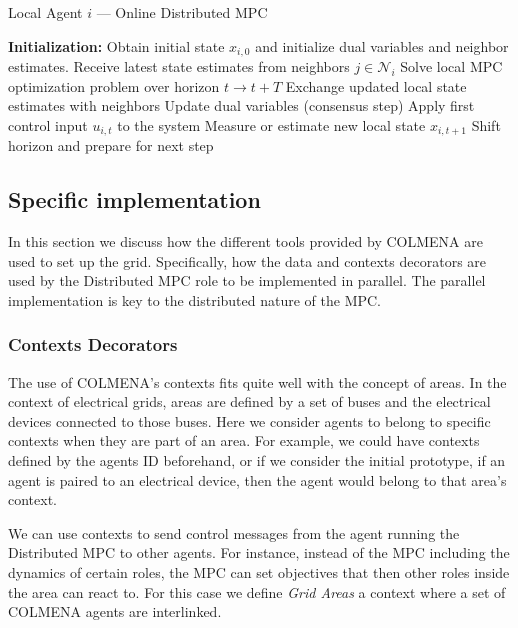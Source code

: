 \documentclass{article}
\begin{document}
\begin{algorithm}[H]
\caption{Local Agent $i$ — Online Distributed MPC}
\begin{algorithmic}[1]
\State \textbf{Initialization:} Obtain initial state $x_{i,0}$ and initialize dual variables and neighbor estimates.
        \State Receive latest state estimates from neighbors $j \in \mathcal{N}_i$
        \State Solve local MPC optimization problem over horizon $t \rightarrow t+T$
        \State Exchange updated local state estimates with neighbors
        \State Update dual variables (consensus step)
    \EndWhile
    \State Apply first control input $u_{i,t}$ to the system
    \State Measure or estimate new local state $x_{i,t+1}$
    \State Shift horizon and prepare for next step
\EndWhile
\end{algorithmic}
\end{algorithm}

\subsection{Specific implementation}

In this section we discuss how the different tools provided by COLMENA are used to set up the grid. Specifically, how the data and contexts decorators are used by the Distributed MPC role to be implemented in parallel. The parallel implementation is key to the distributed nature of the MPC.

\subsubsection*{Contexts Decorators}

The use of COLMENA's contexts fits quite well with the concept of areas. In the context of electrical grids, areas are defined  by a set of buses and the electrical devices connected to those buses. Here we consider agents to belong to specific contexts when they are part of an area. For example, we could have contexts defined by the agents ID beforehand, or if we consider the initial prototype, if an agent is paired to an electrical device, then the agent would belong to that area's context.

We can use contexts to send control messages from the agent running the Distributed MPC to other agents. For instance, instead of the MPC including the dynamics of certain roles, the MPC can set objectives that then other roles inside the area can react to. For this case we define \textit{Grid Areas} a context where a set of COLMENA agents are interlinked.
\end{document}
